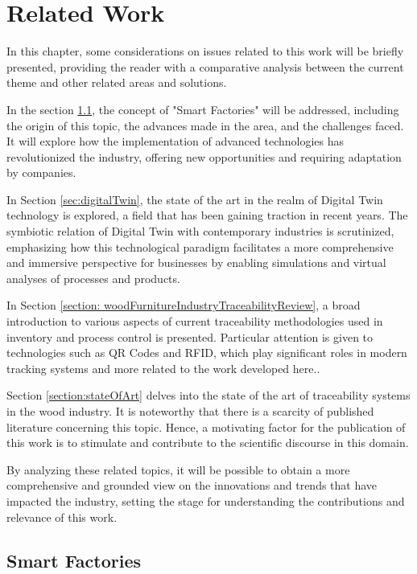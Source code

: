 \chapter{Related Work}\label{cap:relatedWork}

In this chapter, some considerations on issues related to this work will be briefly presented, providing the reader with a comparative analysis between the current theme and other related areas and solutions. 

In the section \ref{sec:smartFactories}, the concept of "Smart Factories" will be addressed, including the origin of this topic, the advances made in the area, and the challenges faced. It will explore how the implementation of advanced technologies has revolutionized the industry, offering new opportunities and requiring adaptation by companies.

In Section \ref{sec:digitalTwin}, the state of the art in the realm of Digital Twin technology is explored, a field that has been gaining traction in recent years. The symbiotic relation of Digital Twin with contemporary industries is scrutinized, emphasizing how this technological paradigm facilitates a more comprehensive and immersive perspective for businesses by enabling simulations and virtual analyses of processes and products.

In Section \ref{section: woodFurnitureIndustryTraceabilityReview}, a broad introduction to various aspects of current traceability methodologies used in inventory and process control is presented. Particular attention is given to technologies such as QR Codes and RFID, which play significant roles in modern tracking systems and  more related to the work developed here..

Section \ref{section:stateOfArt} delves into the state of the art of traceability systems in the wood industry. It is noteworthy that there is a scarcity of published literature concerning this topic. Hence, a motivating factor for the publication of this work is to stimulate and contribute to the scientific discourse in this domain.

By analyzing these related topics, it will be possible to obtain a more comprehensive and grounded view on the innovations and trends that have impacted the industry, setting the stage for understanding the contributions and relevance of this work.


\section{Smart Factories}
\label{sec:smartFactories}

